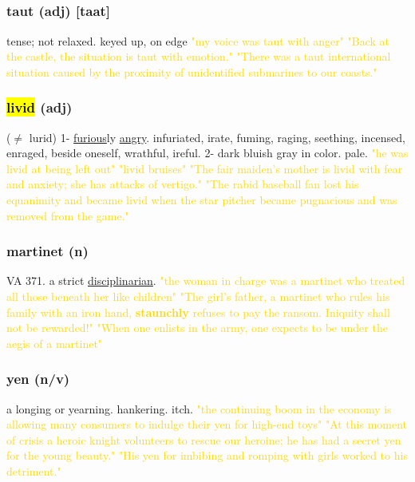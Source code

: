 \documentclass{proc}
\begin{document}
	\newpage
	\subsection{}
	\subsubsection{\textcolor{brickred}{taut} (adj) [taat]}
	 tense; not relaxed. keyed up, on edge
	\textcolor{gold}{"my voice was taut with anger" "Back at the castle, the situation is taut with emotion." "There was a taut international situation caused by the proximity of unidentified submarines to our coasts."}
	
	\subsubsection{\textcolor{brickred}{\hl{livid}} (adj)}
	($\neq$ lurid) 1- \underline{furious}ly \underline{angry}. infuriated, irate, fuming, raging, seething, incensed, enraged, beside oneself, wrathful, ireful.
	2- dark bluish gray in color. pale.
	\textcolor{gold}{"he was livid at being left out" "livid bruises" "The fair maiden's mother is livid with fear and anxiety; she has attacks of vertigo." "The rabid baseball fan lost his equanimity and became livid when the star pitcher became pugnacious and was removed from the game."}
	
	\subsubsection{\textcolor{brickred}{martinet} (n)}
	VA 371. a strict \underline{disciplinarian}.
	\textcolor{gold}{"the woman in charge was a martinet who treated all those beneath her like children" "The girl's father, a martinet who rules his family with an iron hand, \textbf{staunchly} refuses to pay the ransom. Iniquity shall not be rewarded!" "When one enlists in the army, one expects to be under the aegis of a martinet"}
	
	\subsubsection{\textcolor{brickred}{yen} (n/v)}
	a longing or yearning. hankering. itch.
	\textcolor{gold}{"the continuing boom in the economy is allowing many consumers to indulge their yen for high-end toys" "At this moment of crisis a heroic knight volunteers to rescue our heroine; he has had a secret yen for the young beauty." "His yen for imbibing and romping with girls worked to his detriment."}
	
\end{document}
